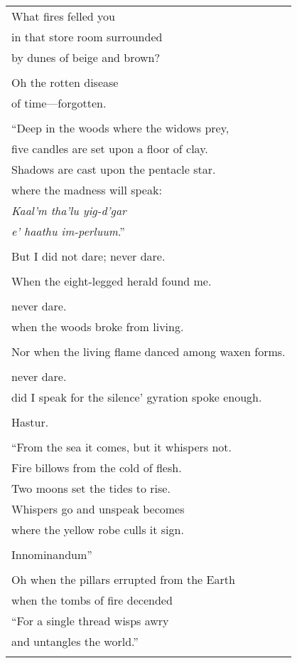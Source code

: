 \documentclass{article}
\begin{document}
\begin{center}
\begin{tabular}{l}
\\
What fires felled you \\
in that store room surrounded \\
by dunes of beige and brown? \\
\\
Oh the rotten disease \\
  of time---forgotten. \\
\\
``Deep in the woods where the widows prey, \\
five candles are set upon a floor of clay. \\
Shadows are cast upon the pentacle star. \\
where the madness will speak: \\
\textit{Kaal'm tha'lu yig-d'gar} \\ %
\textit{e' haathu im-perluum}.'' \\ %
\\
But I did not dare; never dare. \\
\\
When the eight-legged herald found me. \\
\\
never dare. \\
when the woods broke from living. \\
\\
Nor when the living flame danced among waxen forms. \\
\\
never dare. \\
did I speak for the silence' gyration spoke enough. \\
\\
Hastur. \\ %
\\
``From the sea it comes, but it whispers not. \\
Fire billows from the cold of flesh. \\
Two moons set the tides to rise. \\
Whispers go and unspeak becomes \\
where the yellow robe culls it sign. \\
\\
Innominandum'' \\ %
\\
Oh when the pillars errupted from the Earth \\
when the tombs of fire decended \\

``For a single thread wisps awry \\
and untangles the world.'' \\
\\
\end{tabular}
\end{center}
\end{document}
